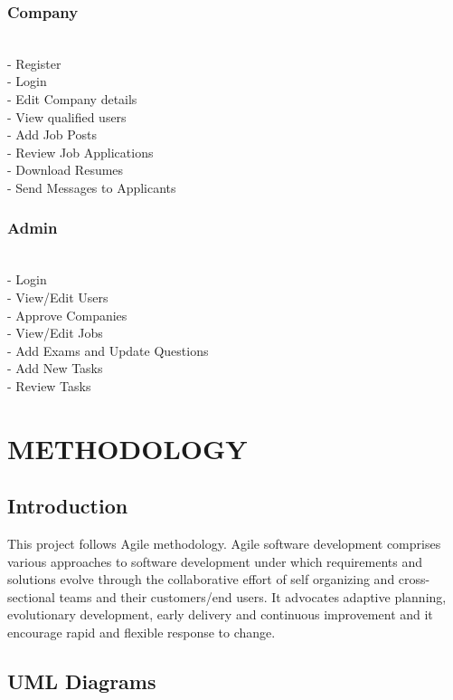 \documentclass[a4paper,12pt]{report}
\begin{document}
\subsection{Company}

\subitem
\\ - Register
\\ - Login
\\ - Edit Company details
\\ - View qualified users
\\ - Add Job Posts
\\ - Review Job Applications
\\ - Download Resumes
\\ - Send Messages to Applicants

\subsection{Admin}

\subitem
\\ - Login
\\ - View/Edit Users
\\ - Approve Companies
\\ - View/Edit Jobs
\\ - Add Exams and Update Questions
\\ - Add New Tasks
\\ - Review Tasks

\pagebreak



\chapter{METHODOLOGY}

\section{Introduction}
\hspace*{12pt}This project follows Agile methodology. Agile software development comprises various approaches to software development under which requirements and solutions evolve through the collaborative effort of self organizing and cross-sectional teams and their customers/end users. It advocates
adaptive planning, evolutionary development, early delivery and continuous improvement and it encourage rapid and flexible response to change.
\newpage
\section{UML Diagrams}
\end{document}
